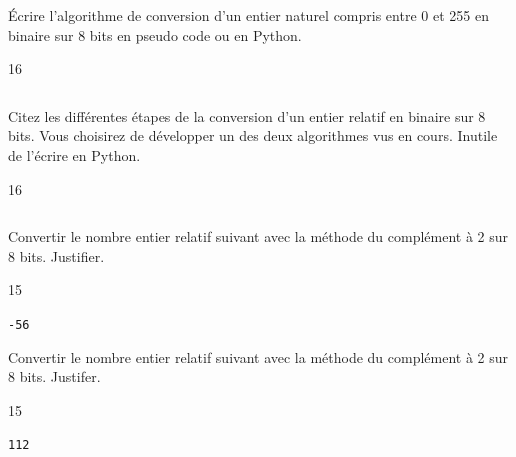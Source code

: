 \documentclass[a4paper,10pt]{report}
\def\ptsexoB{2}
\def\ptsexoC{2}
\def\ptsexoD{2}
\def\ptsexoE{1}
\begin{document}
\medskip

\begin{minipage}{0.49\linewidth}
    \exods{\ptsexoB}

 \'Ecrire l'algorithme de conversion d'un entier naturel compris entre 0 et 255 en binaire sur 8 bits en pseudo code ou en Python.

 \begin{answer}{1}{6} 
    \begin{verbatim}
    \end{verbatim}   
\end{answer}
\end{minipage}\hfill{}
\begin{minipage}{0.49\linewidth}
    \exods{\ptsexoC}

    Citez les différentes étapes de la conversion d'un entier relatif en binaire sur 8 bits. Vous choisirez de développer un des deux algorithmes vus en cours. Inutile de l'écrire en Python.
    
    \begin{answer}{1}{6} 
    \begin{verbatim}
    \end{verbatim}   
\end{answer}
\end{minipage}



\medskip



\begin{minipage}{0.49\linewidth}
 \exods{\ptsexoD}

Convertir le nombre entier relatif suivant avec la méthode du complément à 2 sur 8 bits. Justifier.
\begin{answer}{1}{5} 
    \begin{center}
        \verb|-56|
    \end{center}   
\end{answer}
\end{minipage}\hfill
\begin{minipage}{0.49\linewidth}

     \exods{\ptsexoE}

Convertir le nombre entier relatif suivant avec la méthode du complément à 2 sur 8 bits. Justifer.
\begin{answer}{1}{5} 
    \begin{center}
        \verb|112|
    \end{center}   
\end{answer}
\end{minipage}
\end{document}
